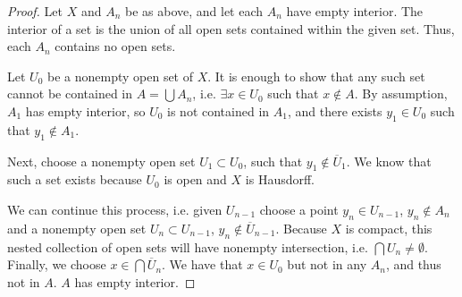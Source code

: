 \documentclass[11pt]{article}
\begin{document}
\begin{proof}
Let \(X\) and \(A_n\) be as above, and let each \(A_n\) have empty interior. The
interior of a set is the union of all open sets contained within the given set.
Thus, each \(A_n\) contains no open sets. 

Let \(U_0\) be a nonempty open set of \(X\). It is enough to show that any such set
cannot be contained in \(A = \bigcup A_n\), i.e. \(\exists x \in U_0\) such that \(x
\not\in A\). By assumption, \(A_1\) has empty interior, so \(U_0\) is not contained
in \(A_1\), and there exists \(y_1 \in U_0\) such that \(y_1\not\in A_1\). 

Next, choose a nonempty open set \(U_1\subset U_0\), such that
\(y_1\not\in\overline{U}_1\). We know that such a set exists because \(U_0\) is open
and \(X\) is Hausdorff. 

We can continue this process, i.e. given \(U_{n-1}\) choose a point
\(y_n\in U_{n-1}\), \(y_n\not\in A_n\) and a nonempty open set \(U_n\subset U_{n-1}\),
\(y_n\not\in\overline{U}_{n-1}\). Because \(X\) is compact, this nested collection
of open sets will have nonempty intersection, i.e. \(\bigcap U_n \not =
\emptyset\). Finally, we choose \(x \in \bigcap \overline{U}_n\). We have that
\(x\in U_0\) but not in any \(A_n\), and thus not in \(A\). \(A\) has empty interior. 
\end{proof}
\end{document}
